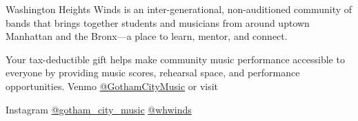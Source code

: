\documentclass{article}[10pt]
\begin{document}
\begin{center}
\begin{minipage}{115mm}
\begin{center}
            \end{center}






            \begin{center}
            {\textbf{}}
            \end{center}
            \vspace{-5mm}

            \begin{center}
            {}
            \end{center}

            \vspace{-3mm}
            \begin{footnotesize}
                Washington Heights Winds is an inter-generational, non-auditioned community of bands that brings together students and musicians from around uptown Manhattan and the Bronx—a place to learn, mentor, and connect.
            \end{footnotesize}



            \begin{center}
            {\textbf{}}
            \end{center}
            \vspace{-3mm}
            \begin{footnotesize}
                Your tax-deductible gift helps make community music performance accessible to everyone by providing music scores, rehearsal space, and performance opportunities.
                Venmo \href{https://account.venmo.com/u/GothamCityMusic}{@GothamCityMusic} or visit \textbf{}
            \end{footnotesize}


            \begin{center}
            {\textbf{}}

                \faInstagram{}{}  Instagram  \href{https://www.instagram.com/gotham_city_music/}{@gotham\_city\_music}
                \href{https://www.instagram.com/whwinds/}{@whwinds}
            \end{center}


        \end{minipage}

    \end{center}
\end{document}
